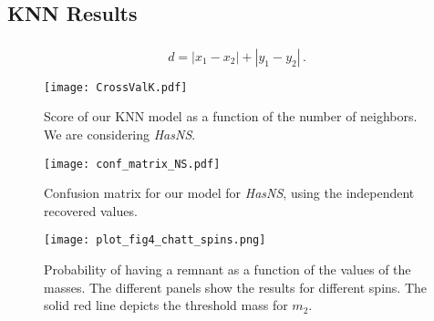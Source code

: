 \subsection{KNN Results}


\subsubsection{}
\begin{equation}
	d = |x_1-x_2|+|y_1-y_2|\,.
\end{equation}


\begin{figure}
    \texttt{[image: CrossValK.pdf]}
    \caption{Score of our KNN model as a function of the number of neighbors. We are considering \textit{HasNS}.}
    \label{fig:crossvalK}
\end{figure}
    
\begin{figure}
    \texttt{[image: conf\_matrix\_NS.pdf]}
    \caption{Confusion matrix for our model for \textit{HasNS}, using the independent recovered values. }
    \label{fig:confmat}
\end{figure}

\begin{figure}
    \texttt{[image: plot\_fig4\_chatt\_spins.png]}
    \caption{Probability of having a remnant as a function of the values of the masses. The different panels show the results for different spins. The solid red line depicts the threshold mass for $m_2$.}
    \label{fig:m1m2}
\end{figure}

